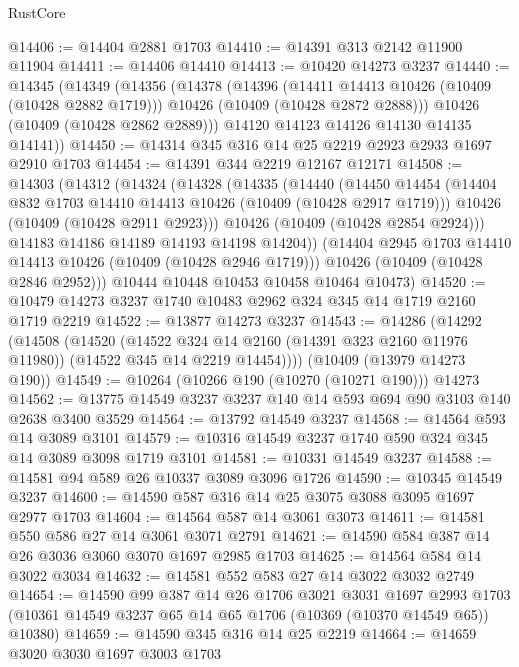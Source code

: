 \begin{lexlean}{RustCore}
\begin{coremodule}
@14406 := @14404 @2881 @1703
@14410 := @14391 @313 @2142 @11900 @11904
@14411 := @14406 @14410
@14413 := @10420 @14273 @3237
@14440 := @14345
    (@14349
      (@14356
        (@14378
          (@14396
            (@14411 @14413 @10426 (@10409 (@10428 @2882 @1719)))
            @10426
            (@10409 (@10428 @2872 @2888)))
          @10426
          (@10409 (@10428 @2862 @2889)))
        @14120
        @14123
        @14126
        @14130
        @14135
        @14141))
@14450 := @14314 @345 @316 @14 @25 @2219 @2923 @2933 @1697 @2910 @1703
@14454 := @14391 @344 @2219 @12167 @12171
@14508 := @14303
    (@14312
      (@14324
        (@14328
          (@14335
            (@14440
              (@14450
                @14454
                (@14404 @832 @1703 @14410 @14413 @10426 (@10409 (@10428 @2917 @1719)))
                @10426
                (@10409 (@10428 @2911 @2923)))
              @10426
              (@10409 (@10428 @2854 @2924)))
            @14183
            @14186
            @14189
            @14193
            @14198
            @14204))
        (@14404 @2945 @1703 @14410 @14413 @10426 (@10409 (@10428 @2946 @1719)))
        @10426
        (@10409 (@10428 @2846 @2952)))
      @10444
      @10448
      @10453
      @10458
      @10464
      @10473)
@14520 := @10479 @14273 @3237 @1740 @10483 @2962 @324 @345 @14 @1719 @2160 @1719 @2219
@14522 := @13877 @14273 @3237
@14543 := @14286
    (@14292
      (@14508
        (@14520
          (@14522 @324 @14 @2160 (@14391 @323 @2160 @11976 @11980))
          (@14522 @345 @14 @2219 @14454))))
    (@10409 (@13979 @14273 @190))
@14549 := @10264 (@10266 @190 (@10270 (@10271 @190))) @14273
@14562 := @13775 @14549 @3237 @3237 @140 @14 @593 @694 @90 @3103 @140 @2638 @3400 @3529
@14564 := @13792 @14549 @3237
@14568 := @14564 @593 @14 @3089 @3101
@14579 := @10316 @14549 @3237 @1740 @590 @324 @345 @14 @3089 @3098 @1719 @3101
@14581 := @10331 @14549 @3237
@14588 := @14581 @94 @589 @26 @10337 @3089 @3096 @1726
@14590 := @10345 @14549 @3237
@14600 := @14590 @587 @316 @14 @25 @3075 @3088 @3095 @1697 @2977 @1703
@14604 := @14564 @587 @14 @3061 @3073
@14611 := @14581 @550 @586 @27 @14 @3061 @3071 @2791
@14621 := @14590 @584 @387 @14 @26 @3036 @3060 @3070 @1697 @2985 @1703
@14625 := @14564 @584 @14 @3022 @3034
@14632 := @14581 @552 @583 @27 @14 @3022 @3032 @2749
@14654 := @14590
    @99
    @387
    @14
    @26
    @1706
    @3021
    @3031
    @1697
    @2993
    @1703
    (@10361 @14549 @3237 @65 @14 @65 @1706 (@10369 (@10370 @14549 @65)) @10380)
@14659 := @14590 @345 @316 @14 @25 @2219
@14664 := @14659 @3020 @3030 @1697 @3003 @1703

\end{coremodule}
\end{lexlean}
